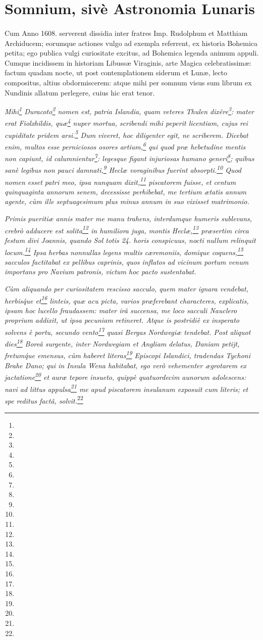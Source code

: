 \documentclass[a4paper, 11pt, oneside, polutonikogreek, german]{article}
\begin{document}
\section{Somnium, sivè Astronomia Lunaris}
\paragraph{}
Cum Anno 1608. serverent dissidia inter fratres Imp. Rudolphum et Matthiam Archiducem; eorumque actiones vulgo ad exempla referrent, ex historia Bohemica petita; ego publica vulgi curiositate excitus, ad Bohemica legenda animum appuli. Cumque incidissem in historiam Libussæ Viraginis, arte Magica celebratissimæ: factum quadam nocte, ut post contemplationem siderum et Lunæ, lecto compositus, altius obdormiscerem: atque mihi per somnum visus sum librum ex Nundinis allatum perlegere, cuius hic erat tenor.

\emph{Mihi\footnote{} Duracoto\footnote{} nomen est, patria Islandia, quam veteres Thulen dixêre\footnote{}: mater erat Fiolxhildis, quæ\footnote{} nuper mortua, scribendi mihi peperit licentiam, cujus rei cupiditate pridem arsi.\footnote{} Dum viveret, hoc diligenter egit, ne scriberem. Dicebat enim, multos esse perniciosos osores artium,\footnote{} qui quod præ hebetudine mentis non capiunt, id calumnientur\footnote{}: legesque figant injuriosas humano generi\footnote{}; quibus sanè legibus non pauci damnati,\footnote{} Heclæ voraginibus fuerint absorpti.\footnote{} Quod nomen esset patri meo, ipsa nunquam dixit,\footnote{} piscatorem fuisse, et centum quinquaginta annorum senem, decessisse perhibebat, me tertium ætatis annum agente, cùm ille septuagesimum plus minus annum in suo vixisset matrimonio.}

\emph{Primis pueritiæ annis mater me manu trahens, interdumque humeris sublevans, crebrò adducere est solita\footnote{} in humiliora juga, montis Heclæ,\footnote{} præsertim circa festum divi Joannis, quando Sol totis 24. horis conspicuus, nocti nullum relinquit locum.\footnote{} Ipsa herbas nonnullas legens multis cæremoniis, domique coquens,\footnote{} sacculos factitabat ex pellibus caprinis, quos inflatos ad vicinum portum venum importans pro Navium patronis, victum hoc pacto sustentabat.}

\emph{Cùm aliquando per curiositatem rescisso sacculo, quem mater ignara vendebat, herbis\'que et\footnote{} linteis, quæ acu picta, varios præferebant characteres, explicatis, ipsam hoc lucello fraudassem: mater irâ succensa, me loco sacculi Nauclero proprium addixit, ut ipsa pecuniam retineret. Atque is postridiè ex insperato solvens è portu, secundo vento\footnote{} quasi Bergas Nordwegiæ tendebat. Post aliquot dies\footnote{} Boreâ surgente, inter Nordwegiam et Angliam delatus, Daniam petijt, fretum\'que emensus, cùm haberet literas\footnote{} Episcopi Islandici, tradendas Tychoni Brahe Dano; qui in Insula Wena habitabat, ego verò vehementer ægrotarem ex jactatione\footnote{} et auræ tepore insueto, quippè quatuordecim aunorum adolescens: navi ad littus appulsa\footnote{} me apud piscatorem insulanum exposuit cum literis; et spe reditus factâ, solvit.}\footnote{}
\end{document}

